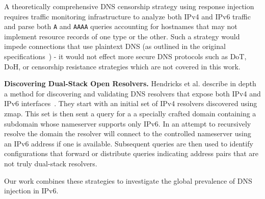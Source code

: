 A theoretically comprehensive DNS censorship strategy using response injection
requires traffic monitoring infrastructure to analyze both IPv4 and IPv6
traffic and parse both \texttt{A} and \texttt{AAAA} queries accounting for hostnames
that may not implement resource records of one type or the other. Such a strategy
would impede connections that use plaintext DNS (as outlined in the
original specifications~\cite{RFC1035,RFC3596}) - it would not effect more secure DNS
protocols such as DoT, DoH, or censorship resistance strategies which are not
covered in this work.

\textbf{Discovering Dual-Stack Open Resolvers.}
Hendricks et al. describe in depth a method for discovering and validating DNS
resolvers that expose both IPv4 and IPv6 interfaces~\cite{hendriks2017potential}.
They start with an initial
set of IPv4 resolvers discovered using zmap. This set is then sent a query for a
a specially crafted domain containing a subdomain whose nameserver supports only
IPv6. In an attempt to recursively resolve the domain the resolver will connect
to the controlled nameserver using an IPv6 address if one is available.
Subsequent queries are then used to identify configurations that forward or
distribute queries indicating address pairs that are not truly dual-stack resolvers.

Our work combines these strategies to investigate the global prevalence of DNS
injection in IPv6.